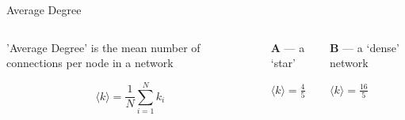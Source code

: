 \documentclass[aspectratio=1610]{beamer}
\begin{document}
\begin{frame}{Average Degree}{}
	\begin{columns}
		\begin{column}{0.33\textwidth}

			'Average Degree' is the mean number of connections 
			per node in a network

			\begin{equation*}
				\langle k \rangle = \frac{1}{N}\sum_{i=1}^{N}k_{i} 
			\end{equation*}
			
		\end{column}
		\begin{column}{0.33\textwidth}
			\centering

			\textbf{A} ---  a `star'
			
			\vspace{1em}

			
			
			\vspace{1em}

			$\langle k \rangle = \frac{4}{5}$

		\end{column}
		\begin{column}{0.33\textwidth}
			\centering 
			\textbf{B} --- a `dense' network			

			\vspace{1em}

			
			
			\vspace{1em}

			$\langle k \rangle = \frac{16}{5}$
		
		\end{column}
	\end{columns}
\end{frame}
\end{document}
